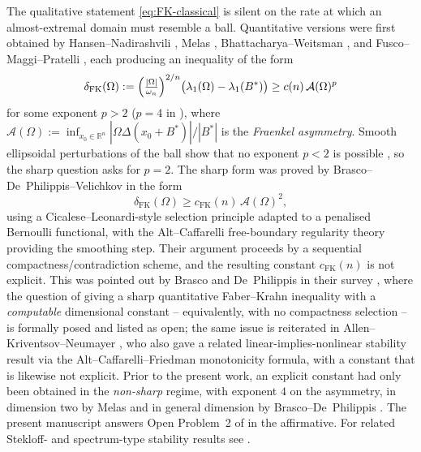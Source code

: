 \documentclass[11pt]{amsart}
\theoremstyle{definition}
\newcommand{\R}{\mathbb R}
\newcommand{\Om}{\Omega}
\newcommand{\Fr}{\mathcal A}
\newcommand{\Bstar}{B^*}
\newcommand{\deltaFK}{\delta_{\mathrm{FK}}}
\begin{document}
\medskip
The qualitative statement \eqref{eq:FK-classical} is silent on the rate at
which an almost-extremal domain must resemble a ball.  Quantitative
versions were first obtained by Hansen--Nadirashvili \cite{HansenNadirashvili1994},
Melas \cite{Melas1992}, Bhattacharya--Weitsman \cite{BhattacharyaWeitsman1999},
and Fusco--Maggi--Pratelli \cite{FuscoMaggiPratelli2009Eigenvalue}, each
producing an inequality of the form
\[
   \deltaFK(\Om)
   :=\Bigl(\tfrac{|\Om|}{\omega_n}\Bigr)^{2/n}
     \bigl(\lambda_1(\Om)-\lambda_1(\Bstar)\bigr)
   \ge c(n)\,\Fr(\Om)^p
\]
for some exponent \(p>2\) (\(p=4\) in \cite{FuscoMaggiPratelli2009Eigenvalue}),
where
\(\Fr(\Om):=\inf_{x_0\in\R^n}|\Om\Delta(x_0+\Bstar)|/|\Bstar|\) is the
\emph{Fraenkel asymmetry}.  Smooth ellipsoidal perturbations of the ball
show that no exponent \(p<2\) is possible
\cite{Brasco2014,BraDeP2017}, so the sharp question asks for \(p=2\).
The sharp form was proved by Brasco--De~Philippis--Velichkov \cite{BDV} in
the form
\begin{equation}\label{eq:BDV}
   \deltaFK(\Om)\ge c_{\mathrm{FK}}(n)\,\Fr(\Om)^2,
\end{equation}
using a Cicalese--Leonardi-style selection principle
\cite{CicaleseLeonardi2012} adapted to a penalised Bernoulli functional,
with the Alt--Caffarelli free-boundary regularity theory
\cite{AltCaffarelli1981} providing the smoothing step.  Their argument
proceeds by a sequential compactness/contradiction scheme, and the
resulting constant \(c_{\mathrm{FK}}(n)\) is not explicit.  This was
pointed out by Brasco and De~Philippis in their survey
\cite[Open~Problem~2, p.~22]{BraDeP2017}, where the question of giving
a sharp quantitative Faber--Krahn inequality with a \emph{computable}
dimensional constant -- equivalently, with no compactness selection --
is formally posed and listed as open; the same issue is reiterated in
Allen--Kriventsov--Neumayer \cite[\S1]{Allen2021}, who also gave a
related linear-implies-nonlinear stability result via the
Alt--Caffarelli--Friedman monotonicity formula, with a constant that is
likewise not explicit.  Prior to the present work, an explicit
constant had only been obtained in the \emph{non-sharp} regime, with
exponent $4$ on the asymmetry, in dimension two by Melas
\cite{Melas1992} and in general dimension by Brasco--De~Philippis
\cite[Thm.~2.10]{BraDeP2017}.  The present manuscript answers Open
Problem~2 of \cite{BraDeP2017} in the affirmative.  For related
Stekloff- and spectrum-type stability results see
\cite{Nitsch2014,DePhilippisVelichkov2020}.
\end{document}
